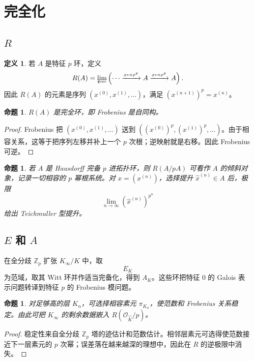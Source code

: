 \documentclass[11pt,a4paper,openany]{ctexbook}
\numberwithin{equation}{chapter}
\newcommand{\Z}{\mathbb{Z}}
\theoremstyle{plain}
\newtheorem{proposition}[theorem]{命题}
\theoremstyle{definition}
\newtheorem{definition}[theorem]{定义}
\theoremstyle{remark}
\begin{document}
\section{完全化}

\subsection{\texorpdfstring{$R$}{R}}

\begin{definition}
若 $A$ 是特征 $p$ 环，定义
\[
  R(A)=\varprojlim\left(\cdots\xrightarrow{x\mapsto x^p}A\xrightarrow{x\mapsto x^p}A\right).
\]
因此 $R(A)$ 的元素是序列 $(x^{(0)},x^{(1)},\ldots)$，满足 $(x^{(n+1)})^p=x^{(n)}$。
\end{definition}

\begin{proposition}
$R(A)$ 是完全环，即 Frobenius 是自同构。
\end{proposition}

\begin{proof}
Frobenius 把 $(x^{(0)},x^{(1)},\ldots)$ 送到 $((x^{(0)})^p,(x^{(1)})^p,\ldots)$。由于相容关系，这等于把序列左移并补上一个 $p$ 次根；逆映射就是右移。因此 Frobenius 可逆。
\end{proof}

\begin{proposition}
若 $A$ 是 Hausdorff 完备 $p$ 进拓扑环，则 $R(A/pA)$ 可看作 $A$ 的倾斜对象，记录一切相容的 $p$ 幂根系统。对 $x=(x^{(n)})$，选择提升 $\widehat x^{(n)}\in A$ 后，极限
\[
  \lim_{n\to\infty}(\widehat x^{(n)})^{p^n}
\]
给出 Teichmuller 型提升。
\end{proposition}

\subsection{\texorpdfstring{$E$ 和 $A$}{E 和 A}}

在全分歧 $\Z_p$ 扩张 $K_\infty/K$ 中，取
\[
  E_K
\]
为范域，取其 Witt 环并作适当完备化，得到 $A_K$。这些环把特征 $0$ 的 Galois 表示问题转译到特征 $p$ 的 Frobenius 模问题。

\begin{proposition}
对足够高的层 $K_n$，可选择相容素元 $\pi_{K_n}$，使范数和 Frobenius 关系稳定。由此可把 $K_\infty$ 的剩余数据嵌入 $R(\mathcal O_{\widehat{\overline K}}/p)$。
\end{proposition}

\begin{proof}
稳定性来自全分歧 $\Z_p$ 塔的迹估计和范数估计。相邻层素元可选得使范数接近下一层素元的 $p$ 次幂；误差落在越来越深的理想中，因此在 $R$ 的逆极限中消失。
\end{proof}
\end{document}
